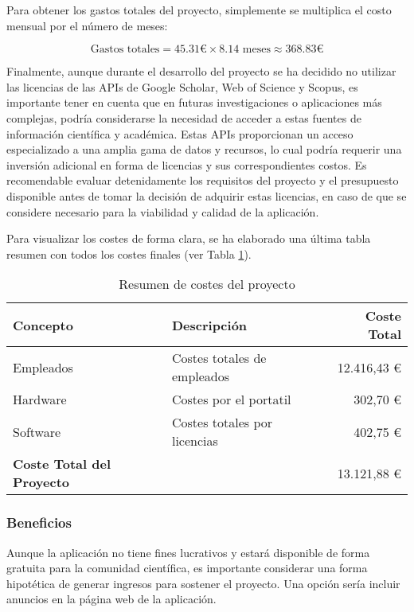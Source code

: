 \begin{enumerate}
    Para obtener los gastos totales del proyecto, simplemente se multiplica el costo mensual por el número de meses:

    \[
    \text{{Gastos totales}} = 45.31 \text{{€}} \times 8.14 \text{{ meses}} \approx 368.83 \text{{€}}
    \]

    Finalmente, aunque durante el desarrollo del proyecto se ha decidido no utilizar las licencias de las APIs de Google Scholar, Web of Science y Scopus, es importante tener en cuenta que en futuras investigaciones o aplicaciones más complejas, podría considerarse la necesidad de acceder a estas fuentes de información científica y académica. Estas APIs proporcionan un acceso especializado a una amplia gama de datos y recursos, lo cual podría requerir una inversión adicional en forma de licencias y sus correspondientes costos. Es recomendable evaluar detenidamente los requisitos del proyecto y el presupuesto disponible antes de tomar la decisión de adquirir estas licencias, en caso de que se considere necesario para la viabilidad y calidad de la aplicación.
\end{enumerate}

Para visualizar los costes de forma clara, se ha elaborado una última tabla resumen con todos los costes finales (ver Tabla \ref{tab:costes-totales}).

\begin{table}[h]
\centering
\begin{tabularx}{\textwidth}{@{}lXr@{}}
\toprule
\textbf{Concepto} & \textbf{Descripción} & \textbf{Coste Total} \\
\midrule
Empleados & Costes totales de empleados & 12.416,43 € \\
Hardware & Costes por el portatil & 302,70 € \\
Software & Costes totales por licencias & 402,75 € \\
\midrule
\textbf{Coste Total del Proyecto} & & 13.121,88 € \\
\bottomrule
\end{tabularx}
\caption{Resumen de costes del proyecto}
\label{tab:costes-totales}
\end{table}


\subsubsection{Beneficios}
Aunque la aplicación no tiene fines lucrativos y estará disponible de forma gratuita para la comunidad científica, es importante considerar una forma hipotética de generar ingresos para sostener el proyecto. Una opción sería incluir anuncios en la página web de la aplicación. 

